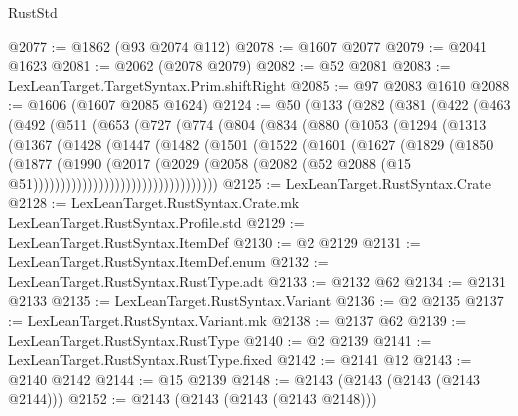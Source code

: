 \begin{lexlean}{RustStd}
\begin{coremodule}
@2077 := @1862 (@93 @2074 @112)
@2078 := @1607 @2077
@2079 := @2041 @1623
@2081 := @2062 (@2078 @2079)
@2082 := @52 @2081
@2083 := LexLeanTarget.TargetSyntax.Prim.shiftRight
@2085 := @97 @2083 @1610
@2088 := @1606 (@1607 @2085 @1624)
@2124 := @50
    (@133
      (@282
        (@381
          (@422
            (@463
              (@492
                (@511
                  (@653
                    (@727
                      (@774
                        (@804
                          (@834
                            (@880
                              (@1053
                                (@1294
                                  (@1313
                                    (@1367
                                      (@1428
                                        (@1447
                                          (@1482
                                            (@1501
                                              (@1522
                                                (@1601
                                                  (@1627
                                                    (@1829
                                                      (@1850
                                                        (@1877
                                                          (@1990
                                                            (@2017
                                                              (@2029
                                                                (@2058
                                                                  (@2082
                                                                    (@52
                                                                      @2088
                                                                      (@15
                                                                        @51))))))))))))))))))))))))))))))))))
@2125 := LexLeanTarget.RustSyntax.Crate
@2128 := LexLeanTarget.RustSyntax.Crate.mk LexLeanTarget.RustSyntax.Profile.std
@2129 := LexLeanTarget.RustSyntax.ItemDef
@2130 := @2 @2129
@2131 := LexLeanTarget.RustSyntax.ItemDef.enum
@2132 := LexLeanTarget.RustSyntax.RustType.adt
@2133 := @2132 @62
@2134 := @2131 @2133
@2135 := LexLeanTarget.RustSyntax.Variant
@2136 := @2 @2135
@2137 := LexLeanTarget.RustSyntax.Variant.mk
@2138 := @2137 @62
@2139 := LexLeanTarget.RustSyntax.RustType
@2140 := @2 @2139
@2141 := LexLeanTarget.RustSyntax.RustType.fixed
@2142 := @2141 @12
@2143 := @2140 @2142
@2144 := @15 @2139
@2148 := @2143 (@2143 (@2143 (@2143 @2144)))
@2152 := @2143 (@2143 (@2143 (@2143 @2148)))

\end{coremodule}
\end{lexlean}
